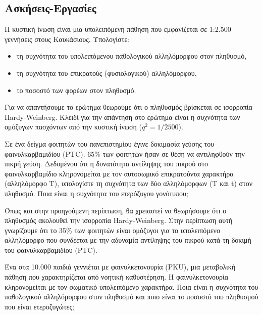 \begin{refsection}
\section{Ασκήσεις-Εργασίες}
\begin{exercises}[Ασκήσεις]
\item Η κυστική ίνωση είναι μια υπολειπόμενη πάθηση που εμφανίζεται σε 1:2.500 γεννήσεις στους Καυκάσιους. Υπολογίστε:
\begin{itemize}
\item τη συχνότητα του υπολειπόμενου παθολογικού αλληλόμορφου στον πληθυσμό,
\item τη συχνότητα του επικρατούς (φυσιολογικού) αλληλόμορφου,
\item το ποσοστό των φορέων στον πληθυσμό.
\end{itemize}
\begin{writesolutionsI} Για να απαντήσουμε το ερώτημα θεωρούμε ότι ο πληθυσμός βρίσκεται σε ισορροπία Hardy-Weinberg. Κλειδί για την απάντηση στο ερώτημα είναι η συχνότητα των ομόζυγων πασχόντων από την κυστική ίνωση ($q^2=1/2500$).
\end{writesolutionsI}
\item Σε ένα δείγμα φοιτητών του πανεπιστημίου έγινε δοκιμασία γεύσης του φαινυλκαρβαμιδίου (PTC). 65\% των φοιτητών ήσαν σε θέση να αντιληφθούν την πικρή γεύση. Δεδομένου ότι η δυνατότητα αντίληψης του πικρού στο φαινυλκαρβαμίδιο κληρονομείται με τον αυτοσωμικό επικρατούντα χαρακτήρα (αλληλόμορφο T), υπολογίστε τη συχνότητα των δύο αλληλόμορφων (Τ και t) στον πληθυσμό. Ποια είναι η συχνότητα του ετερόζυγου γονότυπου;
\begin{writesolutionsI}
Όπως και στην προηγούμενη περίπτωση, θα χρειαστεί να θεωρήσουμε ότι ο πληθυσμός ακολουθεί την ισορροπία Hardy-Weinberg. Στην περίπτωση αυτή γνωρίζουμε ότι το 35\% των φοιτητών είναι ομόζυγοι για το υπολειπόμενο αλληλόμορφο που συνδέεται με την αδυναμία αντίληψης του πικρού κατά τη δοκιμή του φαινυλκαρβαμιδίου (PTC).
\end{writesolutionsI}
\item Ένα στα 10.000 παιδιά γεννιέται με φαινυλκετονουρία (PKU), μια μεταβολική πάθηση που χαρακτηρίζεται από νοητική καθυστέρηση. Η φαινυλκετονουρία κληρονομείται με τον σωματικό υπολειπόμενο χαρακτήρα. Ποια είναι η συχνότητα του παθολογικού αλληλόμορφου στον πληθυσμό και ποιο είναι το ποσοστό του πληθυσμού που είναι ετεροζυγώτες;

\end{exercises}
\end{refsection}
